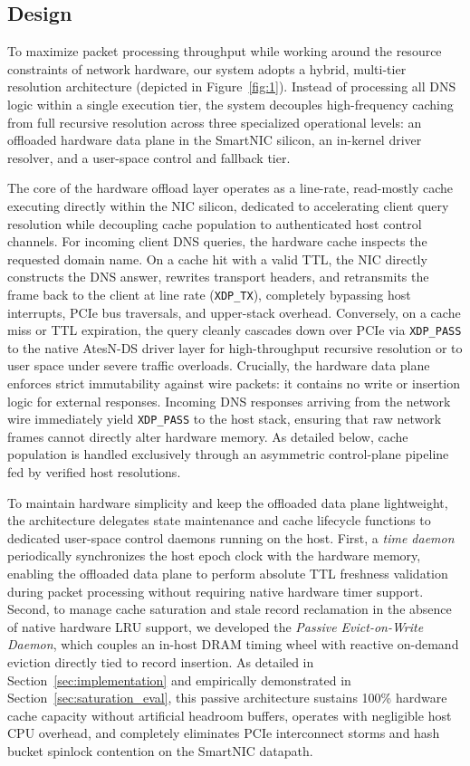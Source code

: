 \documentclass[a4paper,fleqn,colorlinks,hidelinks]{cas-sc}
\begin{document}
\subsection{Design}

To maximize packet processing throughput while working around the resource constraints of network hardware, our system adopts a hybrid, multi-tier resolution architecture (depicted in Figure~\ref{fig:1}). Instead of processing all DNS logic within a single execution tier, the system decouples high-frequency caching from full recursive resolution across three specialized operational levels: an offloaded hardware data plane in the SmartNIC silicon, an in-kernel driver resolver, and a user-space control and fallback tier. 

The core of the hardware offload layer operates as a line-rate, read-mostly cache executing directly within the NIC silicon, dedicated to accelerating client query resolution while decoupling cache population to authenticated host control channels. For incoming client DNS queries, the hardware cache inspects the requested domain name. On a cache hit with a valid TTL, the NIC directly constructs the DNS answer, rewrites transport headers, and retransmits the frame back to the client at line rate (\texttt{XDP\_TX}), completely bypassing host interrupts, PCIe bus traversals, and upper-stack overhead. Conversely, on a cache miss or TTL expiration, the query cleanly cascades down over PCIe via \texttt{XDP\_PASS} to the native AtesN-DS driver layer for high-throughput recursive resolution or to user space under severe traffic overloads. Crucially, the hardware data plane enforces strict immutability against wire packets: it contains no write or insertion logic for external responses. Incoming DNS responses arriving from the network wire immediately yield \texttt{XDP\_PASS} to the host stack, ensuring that raw network frames cannot directly alter hardware memory. As detailed below, cache population is handled exclusively through an asymmetric control-plane pipeline fed by verified host resolutions.

To maintain hardware simplicity and keep the offloaded data plane lightweight, the architecture delegates state maintenance and cache lifecycle functions to dedicated user-space control daemons running on the host. First, a \textit{time daemon} periodically synchronizes the host epoch clock with the hardware memory, enabling the offloaded data plane to perform absolute TTL freshness validation during packet processing without requiring native hardware timer support. Second, to manage cache saturation and stale record reclamation in the absence of native hardware LRU support, we developed the \textit{Passive Evict-on-Write Daemon}, which couples an in-host DRAM timing wheel with reactive on-demand eviction directly tied to record insertion. As detailed in Section~\ref{sec:implementation} and empirically demonstrated in Section~\ref{sec:saturation_eval}, this passive architecture sustains 100\% hardware cache capacity without artificial headroom buffers, operates with negligible host CPU overhead, and completely eliminates PCIe interconnect storms and hash bucket spinlock contention on the SmartNIC datapath.
\end{document}

